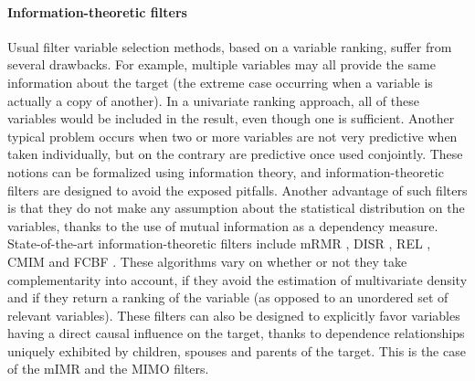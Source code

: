 \paragraph{Information-theoretic filters} Usual filter variable selection
methods, based on a variable ranking, suffer from several drawbacks. For
example, multiple variables may all provide the same information about the
target (the extreme case occurring when a variable is actually a copy of
another). In a univariate ranking approach, all of these variables would be
included in the result, even though one is sufficient. Another typical problem
occurs when two or more variables are not very predictive when taken
individually, but on the contrary are predictive once used conjointly. These
notions can be formalized using information theory, and information-theoretic
filters are designed to avoid the exposed pitfalls. Another advantage of such
filters is that they do not make any assumption about the statistical
distribution on the variables, thanks to the use of mutual information as a
dependency measure. State-of-the-art information-theoretic filters include mRMR
\parencite{peng2005feature}, DISR \parencite{meyer2008information}, REL
\parencite{bell2000formalism}, CMIM \parencite{fleuret2004fast} and FCBF
\parencite{yu2004efficient}. These algorithms vary on whether or not they take
complementarity into account, if they avoid the estimation of multivariate
density and if they return a ranking of the variable (as opposed to an unordered
set of relevant variables). These filters can also be designed to explicitly
favor variables having a direct causal influence on the target, thanks to
dependence relationships uniquely exhibited by children, spouses and parents of
the target. This is the case of the mIMR \parencite{bontempi2010causal} and the
MIMO \parencite{bontempi2011multiple} filters.

